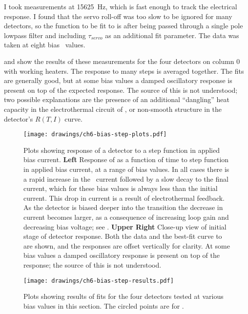 I took measurements at \SI{15625}{\hertz}, which is fast enough to track the electrical response.
I found that the servo roll-off was too slow to be ignored for many detectors, so the function to be fit to is  after being passed through a single pole lowpass filter and including $\tau_{servo}$ as an additional fit parameter.
The data was taken at eight bias \DAC\ values.

 and  show the results of these measurements for the four detectors on column 0 with working heaters.
The response to many steps is averaged together.
The fits are generally good, but at some bias values a damped oscillatory response is present on top of the expected  response.
The source of this is not understood; two possible explanations are the presence of an additional ``dangling'' heat capacity in the electrothermal circuit of  \cite{hoevers_thermal_2000,zink_array-compatible_2006,maasilta_complex_2012}, or non-smooth structure in the detector's $R(T,I)$ curve.

\begin{figure*}
  \centering
\texttt{[image: drawings/ch6-bias-step-plots.pdf]}
\caption[Plots showing response of a detector to ``bias step'' measurements]{
  Plots showing response of a detector to a step function in applied bias current.
\textbf{Left}
Response of  as a function of time to step function in applied bias current, at a range of bias values.
In all cases there is a rapid increase in the \TES\ current followed by a slow decay to the final current, which for these bias values is always less than the initial current.
This drop in current is a result of electrothermal feedback.
As the detector is biased deeper into the transition the decrease in current becomes larger, as a consequence of increasing loop gain and decreasing bias voltage; see .
\textbf{Upper Right}
Close-up view of initial stage of detector response.
Both the data and the best-fit curve to  are shown, and the responses are offset vertically for clarity.
At some bias values a damped oscillatory response is present on top of the  response; the source of this is not understood.
}
\label{fig:ch6-bias-step-plots}
\end{figure*}

\begin{figure*}
  \centering
\texttt{[image: drawings/ch6-bias-step-results.pdf]}
\caption[Results of ``bias step'' measurement fits]{
  Plots showing results of fits for the four detectors tested at various bias values in this section.
  The circled points are for \SOC.
}
\label{fig:ch6-bias-step-results}
\end{figure*}


